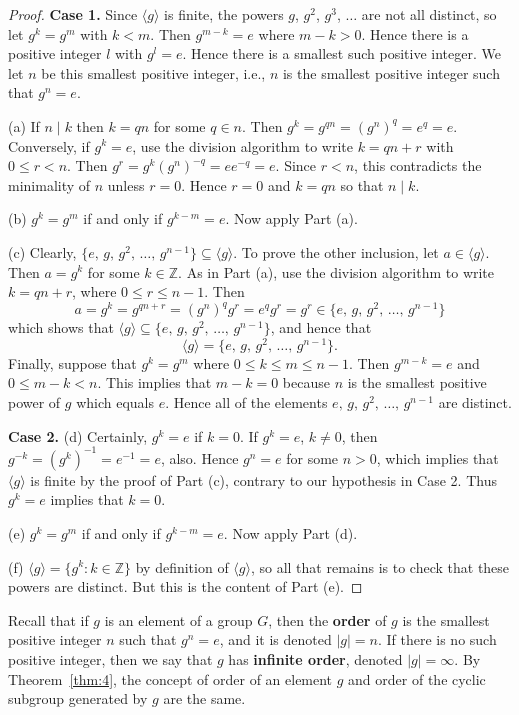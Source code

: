 \documentclass[12pt]{article}
\newcommand{\Z} {{\mathbb Z}}
\newcommand{\order}[1]{\ensuremath{|#1|}}
\newcommand{\divides}{\ensuremath{\mid}}
\newcommand{\<}{\ensuremath{\langle}}
\renewcommand{\>}{\ensuremath{\rangle}}
\newcommand{\eye}{\ensuremath{e}}
\theoremstyle{plain}
\theoremstyle{definition}
\begin{document}
\begin{proof}  {\bf Case 1.} Since $\langle g\rangle $ is finite, the powers
$g$, $g^2$, $g^3$, $\ldots$ are not all distinct, so let $g^k=g^m$
with $k<m$.  Then $g^{m-k} =\eye$ where $m-k>0$.  Hence there is a
positive integer $l$ with $g^l=\eye$.  Hence there is a smallest such
positive integer.  We let $n$ be this smallest positive integer,
i.e., $n$ is the smallest positive integer such that $g^n=\eye$.

(a)  If $n\divides k$ then $k=qn$ for some $q\in n$.  Then
$g^k=g^{qn}=(g^n)^q=\eye^q=\eye$.   Conversely, if $g^k=\eye$, use the
division algorithm to write $k=qn+r$ with $0\le r<n$.  Then
$g^r=g^k(g^n)^{-q} = \eye\eye^{-q} =\eye$.  Since $r<n$, this contradicts
the minimality of $n$ unless $r=0$.  Hence $r=0$ and $k=qn$ so
that $n\divides k$.

(b)  $g^k=g^m$ if and only if $g^{k-m} = \eye$.  Now apply Part (a).

(c)  Clearly, $\{\eye,\, g,\, g^2,\, \ldots,\, g^{n-1}\} \subseteq
\langle g\rangle$.   To prove the other inclusion, let $a\in
\langle g\rangle$.  Then $a=g^k$ for some $k\in \Z$.  As in Part
(a), use the division algorithm to write $k=qn+r$, where $0\le
r\le n-1$.  Then
$$a=g^k=g^{qn+r}=(g^n)^qg^r=\eye^qg^r=g^r\in \{\eye,\, g,\, g^2,\, \ldots,\, g^{n-1}\}$$
which shows  that $\langle g\rangle \subseteq \{\eye,\, g,\, g^2,\,
\ldots,\, g^{n-1}\}$, and hence that
$$\langle g\rangle = \{\eye,\, g,\, g^2,\, \ldots,\, g^{n-1}\}.$$
Finally, suppose that $g^k=g^m$ where $0\le k\le m\le n-1$.   Then
$g^{m-k} =\eye$ and $0\le m-k <n$.  This implies that $m-k=0$ because
$n$ is the smallest positive power of $g$ which equals $\eye$.  Hence
all of the elements $\eye,\, g,\, g^2,\, \ldots,\, g^{n-1}$ are
distinct.

{\bf Case 2.}  (d)  Certainly,  $g^k=\eye$ if $k=0$.  If $g^k=\eye$,
$k\ne 0$, then $g^{-k} = (g^k)^{-1} = \eye^{-1} = \eye$, also.  Hence
$g^n=\eye$ for some $n>0$, which implies that $\langle g\rangle$ is
finite by the proof of Part (c), contrary to our hypothesis in
Case 2.  Thus $g^k=\eye$ implies that $k=0$.

(e)  $g^k=g^m$ if and only if $g^{k-m} =\eye$.  Now apply Part (d).

(f)  $\langle g\rangle =\{g^k: k\in \Z\}$  by definition of
$\langle g\rangle$, so all that remains is to check that these
powers are distinct.  But this is the content of Part (e).
\end{proof}

Recall that if $g$ is an element of a  group $G$, then the {\bf
order} of $g$ is the smallest positive integer $n$ such that
$g^n=\eye$, and it is denoted $\order{g}=n$.  If there is no such positive
integer, then we say that $g$ has {\bf infinite order}, denoted
$\order{g}=\infty$.  By Theorem~\ref{thm:4}, the concept of order of an element
$g$ and order of the cyclic subgroup generated by $g$ are the
same.
\end{document}
